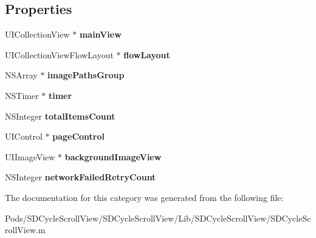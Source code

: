 \subsection*{Properties}
\begin{DoxyCompactItemize}
\item 
\mbox{\label{category_s_d_cycle_scroll_view_07_08_a5cd9e0c6373921645f4935ac18898d68}} 
U\+I\+Collection\+View $\ast$ {\bfseries main\+View}
\item 
\mbox{\label{category_s_d_cycle_scroll_view_07_08_af721d82efa34a0b76aa9b83c798cd453}} 
U\+I\+Collection\+View\+Flow\+Layout $\ast$ {\bfseries flow\+Layout}
\item 
\mbox{\label{category_s_d_cycle_scroll_view_07_08_ab3b491540825c0caa50e9ced04a246a3}} 
N\+S\+Array $\ast$ {\bfseries image\+Paths\+Group}
\item 
\mbox{\label{category_s_d_cycle_scroll_view_07_08_a30ca72284d3b717d23a87d93058ebbfa}} 
N\+S\+Timer $\ast$ {\bfseries timer}
\item 
\mbox{\label{category_s_d_cycle_scroll_view_07_08_a9714396cc1482abf071241c706a116ae}} 
N\+S\+Integer {\bfseries total\+Items\+Count}
\item 
\mbox{\label{category_s_d_cycle_scroll_view_07_08_a02e9ec3ca503d16e0c8f5bab13a22beb}} 
U\+I\+Control $\ast$ {\bfseries page\+Control}
\item 
\mbox{\label{category_s_d_cycle_scroll_view_07_08_af360e81a3d874a1716ef01d89e99f4c9}} 
U\+I\+Image\+View $\ast$ {\bfseries background\+Image\+View}
\item 
\mbox{\label{category_s_d_cycle_scroll_view_07_08_ac6ab1e21489374ea48baf4a05a479c06}} 
N\+S\+Integer {\bfseries network\+Failed\+Retry\+Count}
\end{DoxyCompactItemize}


The documentation for this category was generated from the following file\+:\begin{DoxyCompactItemize}
\item 
Pods/\+S\+D\+Cycle\+Scroll\+View/\+S\+D\+Cycle\+Scroll\+View/\+Lib/\+S\+D\+Cycle\+Scroll\+View/S\+D\+Cycle\+Scroll\+View.\+m\end{DoxyCompactItemize}
